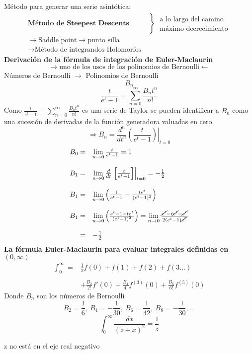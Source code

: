 \documentclass{article}
\theoremstyle{definition}
\begin{document}
Método para generar una serie asintótica:
\[\begin{array}{ll}
	\textbf{Método de Steepest Descents}
	&\left\}\begin{array}{ll}
		\text{a lo largo del camino}\\
		\text{máximo decrecimiento}	
	\end{array}\right.\\
	\to \text{Saddle point}\to \text{punto silla}\\
	\to \text{Método de integrandos Holomorfos}
\end{array}\]
\textbf{Derivación de la fórmula de integración de Euler-Maclaurin}
\[\longrightarrow \text{uno de los usos de los polinomios de Bernoulli}\longleftarrow\]
Números de Bernoulli $\longrightarrow$ Polinomios de Bernoulli
\[B_n\]
\[\frac{t}{e^t-1}=\sum^{\infty}_{n=0}\frac{B_nt^n}{n!}\]
Como $\frac{t}{e^t-1}=\sum^{\infty}_{n=0}\frac{B_nt^n}{n!}$ es una serie de Taylor se pueden identificar a $B_n$ como una sucesión de derivadas de la función generadora valuadas en cero.
\[\Rightarrow B_n=\frac{d^n}{dt^n}\left.\left(\frac{t}{e^t-1}\right)\right|_{t=0}\]
\[
\begin{array}{rl}
	B_0=&\lim\limits_{n\to 0}\frac{t}{e^t-1}=1\\
	\\
	B_1=&\lim\limits_{n\to 0}\frac{d}{dt}\left.\left[\frac{t}{e^t-1}\right]\right|_{t=0}=-\frac{1}{2}\\
	\\
	B_1=& \lim\limits_{n\to 0}\left(\frac{1}{e^t-1}-\frac{te^t}{(e^t-1)^2}\right)\\
	\\
	B_1=& \lim\limits_{n\to 0}\left(\frac{e^t-1-te^t}{(e^t-1)^2}\right)=\lim\limits_{n\to 0}\frac{\cancel{e^t}-t\cancel{e^t}-\cancel{e^t}}{2(e^t-1)\cancel{e^t}}\\
	\\
	=& -\frac{1}{2}
\end{array}\]
\textbf{La fórmula Euler-Maclaurin para evaluar integrales definidas en $(0,\infty)$}
\[
\begin{array}{rl}
	\int^{\infty}_0=&\frac{1}{2}f(0)+f(1)+f(2)+f(3...)\\
	\\
	&+\frac{B_2}{2!}f'(0)+\frac{B_4}{4!}f^{(3)}(0)+\frac{B_6}{6!}f^{(5)}(0)
\end{array}\]
Donde $B_n$ son los números de Bernoulli
\[B_2=\frac{1}{6},\ B_4=-\frac{1}{30},\ B_6=\frac{1}{42},\ B_8=-\frac{1}{30},...\]
\[\int^{\infty}_0\frac{dx}{(z+x)^2}=\frac{1}{z}\]
\begin{center}
	z no está en el eje real negativo
\end{center}
\end{document}
